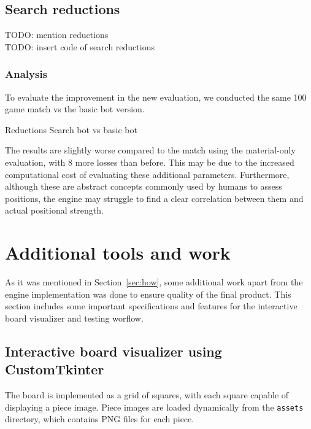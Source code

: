 \subsection{Search reductions}

TODO: mention reductions\\
TODO: insert code of search reductions

\subsubsection{Analysis}

To evaluate the improvement in the new evaluation, we conducted the same 100 game match vs the basic bot version.

\begin{center}
Reductions Search bot vs basic bot\\
\medskip
\end{center}

\noindent The results are slightly worse compared to the match using the material-only evaluation, with 8 more losses than before. This may be due to the increased computational cost of evaluating these additional parameters. Furthermore, although these are abstract concepts commonly used by humans to assess positions, the engine may struggle to find a clear correlation between them and actual positional strength.

\section{Additional tools and work}
\label{sec:tools}

As it was mentioned in Section~\ref{sec:how}, some additional work apart from the engine implementation was done to ensure quality of the final product. This section includes some important specifications and features for the interactive board visualizer and testing worflow.

\subsection{Interactive board visualizer using CustomTkinter}

The board is implemented as a grid of squares, with each square capable of displaying a piece image. Piece images are loaded dynamically from the \texttt{assets} directory, which contains PNG files for each piece.

\vspace{1em}

